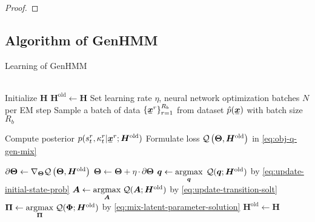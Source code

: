 \documentclass[letterpaper]{article} %
\newcommand{\ubar}[1]{\mkern2mu\underline{\mkern-2mu #1\mkern-2mu}\mkern2mu}
\newcommand{\ubm}[1]{\ubar{\bm{#1}}}
\newcommand{\ubmr}[2]{\ubar{\bm{#1}}^{#2}}
\newcommand{\smtr}[3]{{#1}^{#3}_{#2}}
\begin{document}
\begin{proof}
\end{proof}

\subsection{Algorithm of GenHMM}
\begin{algorithm}[H]
  \caption{Learning of GenHMM}\label{algo:genhmm}
  \begin{algorithmic}[1]
     \\
    \STATE Initialize $\bm{H}$
    \STATE $\bm{H}^{\mathrm{old}} \gets \bm{H}$
    \STATE Set learning rate $\eta$, neural network optimization batches $N$ per EM step
    \STATE Sample a batch of data $\left\{ \ubmr{x}{r} \right\}_{r=1}^{R_b}$ from dataset $\hat{p}(\ubm{x})$ with batch size $R_b$

    \STATE Compute posterior $p(\smtr{s}{t}{r}, \smtr{\kappa}{t}{r}| \ubmr{x}{r}; \bm{H}^{\mathrm{old}})$  
    \STATE Formulate loss ${\mathcal{Q}}\left({\bm{\Theta}}, {\bm{H}}^{\mathrm{old}}\right)$ in \eqref{eq:obj-q-gen-mix}

    \STATE $\partial{\bm{\Theta}} \gets  \nabla_{\bm{\Theta}} {\mathcal{Q}}\left({\bm{\Theta}},{\bm{H}}^{\mathrm{old}}\right)$
    \STATE $\bm{\Theta} \gets \bm{\Theta} + \eta \cdot \partial{\bm{\Theta}}$
    \ENDFOR
    \STATE $\bm{q} \gets \underset{\bm{q}}{\operatorname{argmax}}\;\, \mathcal{Q}(\bm{q}; \bm{H}^{\mathrm{old}})$ by \eqref{eq:update-initial-state-prob}
    \STATE $\bm{A} \gets \underset{\bm{A}}{\operatorname{argmax}}\;\mathcal{Q}(\bm{A}; \bm{H}^{\mathrm{old}})$ by \eqref{eq:update-transition-solt}
    \STATE $\bm{\Pi} \gets \underset{\bm{\Pi}}{\operatorname{argmax}}\;\mathcal{Q}(\bm{\Phi}; \bm{H}^{\mathrm{old}})$ by \eqref{eq:mix-latent-parameter-solution}
    \STATE $\bm{H}^{\mathrm{old}} \gets \bm{H}$
    \ENDFOR
  \end{algorithmic}
\end{algorithm}
\end{document}
